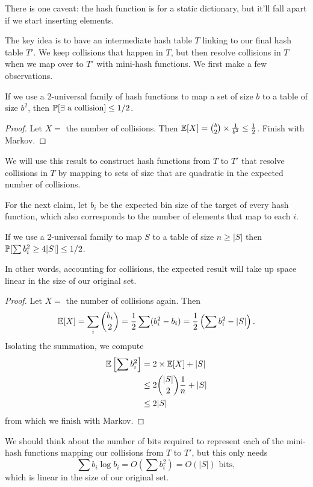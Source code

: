 \documentclass[11 pt]{scrartcl}
\begin{document}
There is one caveat: the hash function is for a static dictionary, but it'll fall apart if we start inserting elements. 

The key idea is to have an intermediate hash table $T$ linking to our final hash table $T'$. We keep collisions that happen in $T$, but then resolve collisions in $T$ when we map over to $T'$ with mini-hash functions. We first make a few observations. 

\begin{claim}
    If we use a 2-universal family of hash functions to map a set of size $b$ to a table of size $b^2$, then $\mathbb P[\exists\text{ a collision}] \leq 1/2$.  
\end{claim}
\begin{proof}
    Let $X = $ the number of collisions. Then $\mathbb E[X] = \binom{b}{2} \times \frac{1}{b^2} \leq \frac{1}{2}$. Finish with Markov.
\end{proof}
We will use this result to construct hash functions from $T$ to $T'$ that resolve collisions in $T$ by mapping to sets of size that are quadratic in the expected number of collisions. 

For the next claim, let $b_i$ be the expected bin size of the target of every hash function, which also corresponds to the number of elements that map to each $i$. 
\begin{claim}
    If we use a 2-universal family to map $S$ to a table of size $n \geq |S|$ then $\mathbb P[\sum b_i^2 \geq 4|S| ] \leq 1/2$.
\end{claim}
In other words, accounting for collisions, the expected result will take up space linear in the size of our original set. 
\begin{proof}
    Let $X = $ the number of collisions again. Then 
    \[ \mathbb E[X] = \sum_i \dbinom{b_i}{2} = \dfrac{1}{2} \sum (b_i^2 - b_i) = \frac{1}{2} \left(\sum b_i^2 - |S|\right).\]
    Isolating the summation, we compute 
    \begin{align*}
        \mathbb E\left[\sum b_i^2\right] &= 2\times \mathbb E[X] + |S| \\ 
                        &\leq 2\binom{|S|}{2}\frac{1}{n} + |S| \\ 
                        &\leq 2|S|
    \end{align*}
    from which we finish with Markov. 
\end{proof}

We should think about the number of bits required to represent each of the mini-hash functions mapping our collisions from $T$ to $T'$, but this only needs 
\[ \sum b_i \log b_i = O\left(\sum b_i^2\right) = O(|S|)\text{ bits},\] 
which is linear in the size of our original set. 
\end{document}
